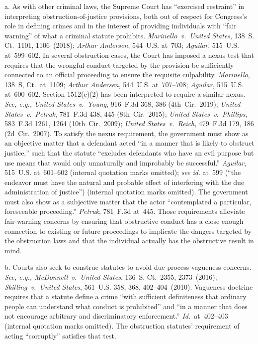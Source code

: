 a. As with other criminal laws, the Supreme Court has ``exercised restraint'' in interpreting obstruction-of-justice provisions, both out of respect for Congress's role in defining crimes and in the interest of providing individuals with ``fair warning'' of what a criminal statute prohibits.
\textit{Marinello~v.\ United States}, 138~S. Ct.~1101, 1106~(2018);
\textit{Arthur Andersen}, 544~U.S. at~703;
\textit{Aguilar}, 515~U.S. at~599--602.
In several obstruction cases, the Court has imposed a nexus test that requires that the wrongful conduct targeted by the provision be sufficiently connected to an official proceeding to ensure the requisite culpability.
\textit{Marinello}, 138~S, Ct.~at~1109;
\textit{Arthur Andersen}, 544~U.S. at~707--708;
\textit{Aguilar}, 515~U.S. at~600--602.
Section 1512(c)(2) has been interpreted to require a similar nexus.
\textit{See, e.g., United States~v.\ Young}, 916~F.3d 368, 386 (4th~Cir.~2019);
\textit{United States~v.\ Petruk}, 781~F.3d 438, 445 (8th~Cir.~2015);
\textit{United States~v.\ Phillips}, 583~F.3d 1261, 1264 (10th~Cir.~2009);
\textit{United States~v.\ Reich}, 479~F.3d 179, 186 (2d~Cir.~2007).
To satisfy the nexus requirement, the government must show as an objective matter that a defendant acted ``in a manner that is likely to obstruct justice,'' such that the statute ``excludes defendants who have an evil purpose but use means that would only unnaturally and improbably be successful.''
\textit{Aguilar}, 515~U.S. at~601--602 (internal quotation marks omitted);
\textit{see id}. at~599 (``the endeavor must have the natural and probable effect of interfering with the due administration of justice'') (internal quotation marks omitted).
The government must also show as a subjective matter that the actor ``contemplated a particular, foreseeable proceeding.''
\textit{Petruk}, 781~F.3d at~445.
Those requirements alleviate fair-warning concerns by ensuring that obstructive conduct has a close enough connection to existing or future proceedings to implicate the dangers targeted by the obstruction laws and that the individual actually has the obstructive result in mind.

b. Courts also seek to construe statutes to avoid due process vagueness concerns.
\textit{See, e.g., McDonnell~v.\ United States}, 136~S. Ct.~2355, 2373~(2016);
\textit{Skilling~v.\ United States}, 561~U.S. 358, 368, 402--404~(2010).
Vagueness doctrine requires that a statute define a crime ``with sufficient definiteness that ordinary people can understand what conduct is prohibited'' and ``in a manner that does not encourage arbitrary and discriminatory enforcement.''
\textit{Id.}~at~402--403 (internal quotation marks omitted).
The obstruction statutes' requirement of acting ``corruptly'' satisfies that test.

